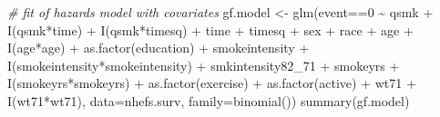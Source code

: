 \documentclass[
  10pt,
]{book}
\newenvironment{Shaded}{\begin{snugshade}}{\end{snugshade}}
\newcommand{\AttributeTok}[1]{\textcolor[rgb]{0.77,0.63,0.00}{#1}}
\newcommand{\CommentTok}[1]{\textcolor[rgb]{0.56,0.35,0.01}{\textit{#1}}}
\newcommand{\DecValTok}[1]{\textcolor[rgb]{0.00,0.00,0.81}{#1}}
\newcommand{\FunctionTok}[1]{\textcolor[rgb]{0.00,0.00,0.00}{#1}}
\newcommand{\NormalTok}[1]{#1}
\newcommand{\OtherTok}[1]{\textcolor[rgb]{0.56,0.35,0.01}{#1}}
\newcommand{\SpecialCharTok}[1]{\textcolor[rgb]{0.00,0.00,0.00}{#1}}
\begin{document}
\begin{Shaded}
\begin{Highlighting}[]
\CommentTok{\# fit of hazards model with covariates}
\NormalTok{gf.model }\OtherTok{\textless{}{-}} \FunctionTok{glm}\NormalTok{(event}\SpecialCharTok{==}\DecValTok{0} \SpecialCharTok{\textasciitilde{}}\NormalTok{ qsmk }\SpecialCharTok{+} \FunctionTok{I}\NormalTok{(qsmk}\SpecialCharTok{*}\NormalTok{time) }\SpecialCharTok{+} \FunctionTok{I}\NormalTok{(qsmk}\SpecialCharTok{*}\NormalTok{timesq)}
                \SpecialCharTok{+}\NormalTok{ time }\SpecialCharTok{+}\NormalTok{ timesq }\SpecialCharTok{+}\NormalTok{ sex }\SpecialCharTok{+}\NormalTok{ race }\SpecialCharTok{+}\NormalTok{ age }\SpecialCharTok{+} \FunctionTok{I}\NormalTok{(age}\SpecialCharTok{*}\NormalTok{age)}
                \SpecialCharTok{+} \FunctionTok{as.factor}\NormalTok{(education) }\SpecialCharTok{+}\NormalTok{ smokeintensity }
                \SpecialCharTok{+} \FunctionTok{I}\NormalTok{(smokeintensity}\SpecialCharTok{*}\NormalTok{smokeintensity) }\SpecialCharTok{+}\NormalTok{ smkintensity82\_71 }
                \SpecialCharTok{+}\NormalTok{ smokeyrs }\SpecialCharTok{+} \FunctionTok{I}\NormalTok{(smokeyrs}\SpecialCharTok{*}\NormalTok{smokeyrs) }\SpecialCharTok{+} \FunctionTok{as.factor}\NormalTok{(exercise) }
                \SpecialCharTok{+} \FunctionTok{as.factor}\NormalTok{(active) }\SpecialCharTok{+}\NormalTok{ wt71 }\SpecialCharTok{+} \FunctionTok{I}\NormalTok{(wt71}\SpecialCharTok{*}\NormalTok{wt71), }
                \AttributeTok{data=}\NormalTok{nhefs.surv, }\AttributeTok{family=}\FunctionTok{binomial}\NormalTok{())}
\FunctionTok{summary}\NormalTok{(gf.model)}
\end{Highlighting}
\end{Shaded}
\end{document}
